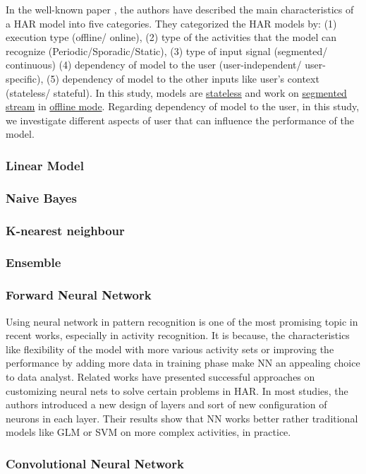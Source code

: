 \documentclass[journal,article,submit,moreauthors,pdftex]{Definitions/mdpi}
\begin{document}
In the well-known paper \cite{bulling2014tutorial}, the authors have described the main characteristics of a HAR model into five categories. They categorized the HAR models by: (1) execution type (offline/ online), (2) type of the activities that the model can recognize (Periodic/Sporadic/Static), (3) type of input signal (segmented/ continuous) (4) dependency of model to the user (user-independent/ user-specific), (5) dependency of model to the other inputs like user's context (stateless/ stateful).  In this study, models are \underline{stateless} and work on \underline{segmented stream} in \underline{offline mode}. Regarding dependency of model to the user, in this study, we investigate different aspects of user that can influence the performance of the model.\\

\subsubsection{Linear Model}
\subsubsection{Naive Bayes}
\subsubsection{K-nearest neighbour}
\subsubsection{Ensemble}
\subsubsection{Forward Neural Network}

Using neural network in pattern recognition is one of the most promising topic in recent works, especially in activity recognition. It is because, the characteristics like flexibility of the model with more various activity sets or improving the performance by adding more data in training phase make NN an appealing choice to data analyst. Related works have presented successful approaches on customizing neural nets to solve certain problems in HAR. In most studies, the authors introduced a new design of layers and sort of new configuration of neurons in each layer. Their results show that NN works better rather traditional models like GLM or SVM on more complex activities, in practice.


\subsubsection{Convolutional Neural Network}
\end{document}
